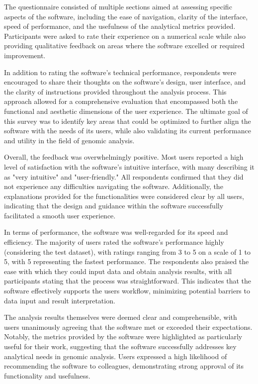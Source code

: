 The questionnaire consisted of multiple sections aimed at assessing specific aspects of the software, including the ease of navigation, clarity of the interface, speed of performance, and the usefulness of the analytical metrics provided. Participants were asked to rate their experience on a numerical scale while also providing qualitative feedback on areas where the software excelled or required improvement.

In addition to rating the software's technical performance, respondents were encouraged to share their thoughts on the software's design, user interface, and the clarity of instructions provided throughout the analysis process. This approach allowed for a comprehensive evaluation that encompassed both the functional and aesthetic dimensions of the user experience. The ultimate goal of this survey was to identify key areas that could be optimized to further align the software with the needs of its users, while also validating its current performance and utility in the field of genomic analysis.

Overall, the feedback was overwhelmingly positive. Most users reported a high level of satisfaction with the software's intuitive interface, with many describing it as "very intuitive" and "user-friendly." All respondents confirmed that they did not experience any difficulties navigating the software. Additionally, the explanations provided for the functionalities were considered clear by all users, indicating that the design and guidance within the software successfully facilitated a smooth user experience.

In terms of performance, the software was well-regarded for its speed and efficiency. The majority of users rated the software's performance highly (considering the test dataset), with ratings ranging from 3 to 5 on a scale of 1 to 5, with 5 representing the fastest performance. The respondents also praised the ease with which they could input data and obtain analysis results, with all participants stating that the process was straightforward. This indicates that the software effectively supports the users workflow, minimizing potential barriers to data input and result interpretation.

The analysis results themselves were deemed clear and comprehensible, with users unanimously agreeing that the software met or exceeded their expectations. Notably, the metrics provided by the software were highlighted as particularly useful for their work, suggesting that the software successfully addresses key analytical needs in genomic analysis. Users expressed a high likelihood of recommending the software to colleagues, demonstrating strong approval of its functionality and usefulness.

